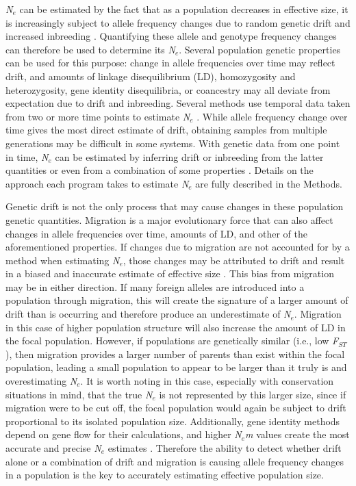 \emph{N}$_e$ can be estimated by the fact that as a population decreases in effective size, 
it is increasingly subject to allele frequency changes due to random genetic drift and increased 
inbreeding \citep{Caballero:1994}. Quantifying these allele and genotype frequency changes can therefore 
be used to determine its \emph{N}$_e$. Several population genetic properties can be used for 
this purpose: change in allele frequencies over time may reflect drift, and amounts of linkage 
disequilibrium (LD), homozygosity and heterozygosity, gene identity disequilibria, or coancestry 
may all deviate from expectation due to drift and inbreeding. Several methods use temporal data 
taken from two or more time points to estimate \emph{N}$_e$ \citep{Nei:1981, Pollak:1983, Beaumont:2003, 
Wang:2003, Anderson:2005, Jorde:2007}. While allele frequency change over time gives the most 
direct estimate of drift, obtaining samples from multiple generations 
may be difficult in some systems. With genetic data from one point in time, \emph{N}$_e$ can be 
estimated by inferring drift or inbreeding from the latter quantities \citep{Hill:1981, Pudovkin:1996, Vitalis:2001a, Nomura:2008, Waples:2008, Wang:2009} or even from a combination of 
some properties \citep{Tallmon:2008}. Details on the approach each program takes to estimate 
\emph{N}$_e$ are fully described in the Methods.

Genetic drift is not the only process that may cause changes in these population genetic 
quantities. Migration is a major evolutionary force that can also affect changes in allele 
frequencies over time, amounts of LD, and other of the aforementioned properties. If changes 
due to migration are not accounted for by a method when estimating \emph{N}$_e$, those 
changes may be attributed to drift and result in a biased and inaccurate estimate of effective 
size \citep{Wang:2003}. This bias from migration may be in either direction. If many 
foreign alleles are introduced into a population through migration, this will create the signature 
of a larger amount of drift than is occurring and therefore produce an underestimate of 
\emph{N}$_e$. Migration in this case of higher population structure will also increase 
the amount of LD in the focal population. However, if populations are genetically similar 
(i.e., low \emph{F}$_{ST}$), then migration provides a larger number of parents than exist within the 
focal population, leading a small population to appear to be larger than it truly is and 
overestimating \emph{N}$_e$. It is worth noting in this case, especially with conservation 
situations in mind, that the true \emph{N}$_e$ is not represented by this larger size, since 
if migration were to be cut off, the focal population would again be subject to drift proportional 
to its isolated population size. Additionally, gene identity methods depend on gene flow for their 
calculations, and higher \emph{N}$_e$\emph{m} values create the most accurate and precise 
\emph{N}$_e$ estimates \citep{Vitalis:2001a, Vitalis:2001b}. Therefore the ability to detect 
whether drift alone or a combination of drift and migration is causing allele frequency 
changes in a population is the key to accurately estimating effective population size.

